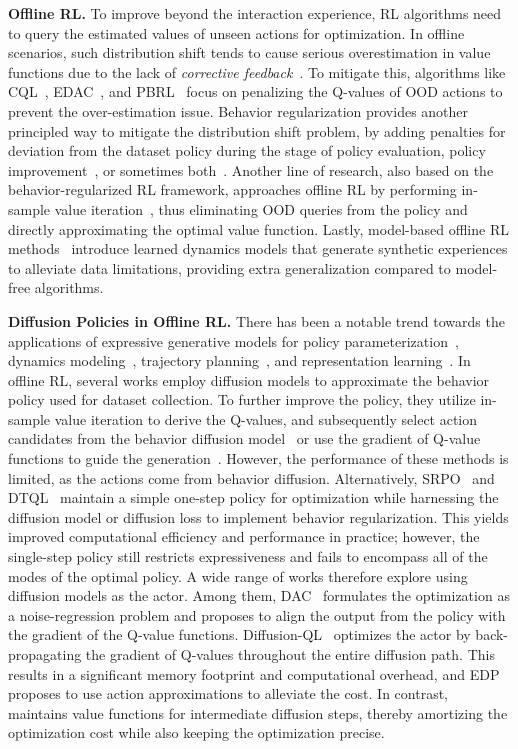 \textbf{Offline RL. }
To improve beyond the interaction experience, RL algorithms need to query the estimated values of unseen actions for optimization. In offline scenarios, such distribution shift tends to cause serious overestimation in value functions due to the lack of \textit{corrective feedback}~\citep{discor}. To mitigate this, algorithms like CQL~\citep{cql}, EDAC~\citep{EDAC}, and PBRL~\citep{pbrl} focus on penalizing the Q-values of OOD actions to prevent the over-estimation issue. Behavior regularization provides another principled way to mitigate the distribution shift problem, by adding penalties for deviation from the dataset policy during the stage of policy evaluation, policy improvement~\cite{bcq,td3bc,prdc}, or sometimes both~\citep{brac,rebrac}. Another line of research, also based on the behavior-regularized RL framework, approaches offline RL by performing in-sample value iteration~\citep{iql,xql,ivr}, thus eliminating OOD queries from the policy and directly approximating the optimal value function. Lastly, model-based offline RL methods~\citep{mopo,redm,mobile,morec} introduce learned dynamics models that generate synthetic experiences to alleviate data limitations, providing extra generalization compared to model-free algorithms. 

\textbf{Diffusion Policies in Offline RL. }There has been a notable trend towards the applications of expressive generative models for policy parameterization~\citep{diffuser}, dynamics modeling~\citep{twm,dwm}, trajectory planning~\citep{dt,dd,act}, and representation learning~\citep{diffsr}. In offline RL, several works employ diffusion models to approximate the behavior policy used for dataset collection. To further improve the policy, they utilize in-sample value iteration to derive the Q-values, and subsequently select action candidates from the behavior diffusion model~\citep{idql,sfbc} or use the gradient of Q-value functions to guide the generation~\citep{qgpo,diffusiondice}. However, the performance of these methods is limited, as the actions come from behavior diffusion. Alternatively, SRPO~\citep{srpo} and DTQL~\citep{dtql} maintain a simple one-step policy for optimization while harnessing the diffusion model or diffusion loss to implement behavior regularization. This yields improved computational efficiency and performance in practice; however, the single-step policy still restricts expressiveness and fails to encompass all of the modes of the optimal policy. A wide range of works therefore explore using diffusion models as the actor. Among them, DAC~\citep{dac} formulates the optimization as a noise-regression problem and proposes to align the output from the policy with the gradient of the Q-value functions. Diffusion-QL~\citep{dql} optimizes the actor by back-propagating the gradient of Q-values throughout the entire diffusion path. This results in a significant memory footprint and computational overhead, and EDP~\citep{edp} proposes to use action approximations to alleviate the cost. In contrast, \algbb maintains value functions for intermediate diffusion steps, thereby amortizing the optimization cost while also keeping the optimization precise. 